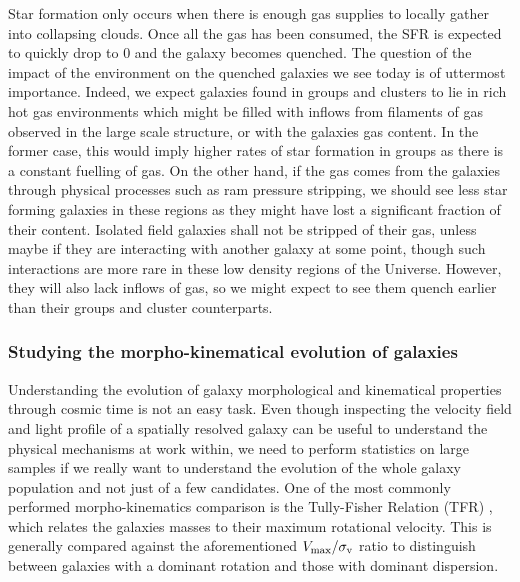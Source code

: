 Star formation only occurs when there is enough gas supplies to locally gather into collapsing clouds. Once all the gas has been consumed, the SFR is expected to quickly drop to $0$ and the galaxy becomes quenched. The question of the impact of the environment on the quenched galaxies we see today is of uttermost importance. Indeed, we expect galaxies found in groups and clusters to lie in rich hot gas environments which might be filled with inflows from filaments of gas observed in the large scale structure, or with the galaxies gas content. In the former case, this would imply higher rates of star formation in groups as there is a constant fuelling of gas. On the other hand, if the gas comes from the galaxies through physical processes such as ram pressure stripping, we should see less star forming galaxies in these regions as they might have lost a significant fraction of their content. Isolated field galaxies shall not be stripped of their gas, unless maybe if they are interacting with another galaxy at some point, though such interactions are more rare in these low density regions of the Universe. However, they will also lack inflows of gas, so we might expect to see them quench earlier than their groups and cluster counterparts. 


\subsubsection{Studying the morpho-kinematical evolution of galaxies}

\begin{wrapfigure}{l}{0.5\linewidth}
	\centering
	\texttt{[image: \{Figures/MASSIV\_TFR]}.eps}
	\caption[MASSIV Tully-Fisher relation]{Stellar-mas TFR at $z \sim 1.2$ for rotating galaxies in MASSIV survey (best-fit blue line) compared against two local relations (black, $z=0$), \shortciteA{Puech2008} (red, $z \approx 0.6$), \shortciteA{Cresci2009} (orange, $z \approx 2.2$) and \shortciteA{Gnerucci2011} (magenta, $z\sim 3$).}
\end{wrapfigure}

Understanding the evolution of galaxy morphological and kinematical properties through cosmic time is not an easy task. Even though inspecting the velocity field and light profile of a spatially resolved galaxy can be useful to understand the physical mechanisms at work within, we need to perform statistics on large samples if we really want to understand the evolution of the whole galaxy population and not just of a few candidates. One of the most commonly performed morpho-kinematics comparison is the Tully-Fisher Relation (TFR) , which relates the galaxies masses to their maximum rotational velocity. This is generally compared against the aforementioned $V_{\rm{max}}/\sigma_{\rm{v}}$ ratio to distinguish between galaxies with a dominant rotation and those with dominant dispersion. 

